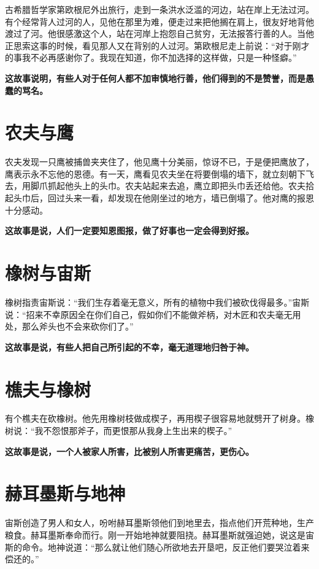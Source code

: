 古希腊哲学家第欧根尼外出旅行，走到一条洪水泛滥的河边，站在岸上无法过河。有个经常背人过河的人，见他在那里为难，便走过来把他搁在肩上，很友好地背他渡过了河。他很感激这个人，站在河岸上抱怨自己贫穷，无法报答行善的人。当他正思索这事的时候，看见那人又在背别的人过河。第欧根尼走上前说：“对于刚才的事我不必再感谢你了。我现在知道，你不加选择的这样做，只是一种怪癖。”

{\bfseries \color{red}这故事说明，有些人对于任何人都不加审慎地行善，他们得到的不是赞誉，而是愚蠢的骂名。}

\section{农夫与鹰}

农夫发现一只鹰被捕兽夹夹住了，他见鹰十分美丽，惊讶不已，于是便把鹰放了，鹰表示永不忘他的恩德。有一天，鹰看见农夫坐在将要倒塌的墙下，就立刻朝下飞去，用脚爪抓起他头上的头巾。农夫站起来去追，鹰立即把头巾丢还给他。农夫拾起头巾后，回过头来一看，却发现在他刚坐过的地方，墙已倒塌了。他对鹰的报恩十分感动。

{\bfseries \color{red}这故事是说，人们一定要知恩图报，做了好事也一定会得到好报。}

\section{橡树与宙斯}

橡树指责宙斯说：“我们生存着毫无意义，所有的植物中我们被砍伐得最多。”宙斯说：“招来不幸原因全在你们自己，假如你们不能做斧柄，对木匠和农夫毫无用处，那么斧头也不会来砍你们了。”

{\bfseries \color{red}这故事是说，有些人把自己所引起的不幸，毫无道理地归咎于神。}

\section{樵夫与橡树}

有个樵夫在砍橡树。他先用橡树枝做成楔子，再用楔子很容易地就劈开了树身。橡树说：“我不怨恨那斧子，而更恨那从我身上生出来的楔子。”

{\bfseries \color{red}这故事是说，一个人被家人所害，比被别人所害更痛苦，更伤心。}

\section{赫耳墨斯与地神}

宙斯创造了男人和女人，吩咐赫耳墨斯领他们到地里去，指点他们开荒种地，生产粮食。赫耳墨斯奉命而行。刚一开始地神就要阻挠。赫耳墨斯就强迫她，说这是宙斯的命令。地神说道：“那么就让他们随心所欲地去开垦吧，反正他们要哭泣着来偿还的。”

